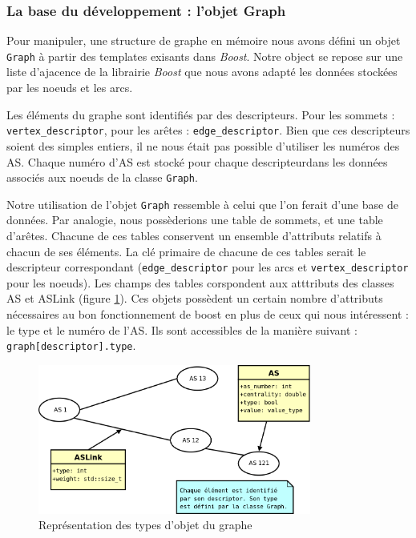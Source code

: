 \subsubsection{La base du développement : l'objet Graph}

Pour manipuler, une structure de graphe en mémoire nous avons défini un objet \verb|Graph| à partir des templates exisants dans \textit{Boost}. Notre object se repose sur une liste d'ajacence de la librairie \textit{Boost} que nous avons adapté les données stockées par les noeuds et les arcs.

Les éléments du graphe sont identifiés par des descripteurs. Pour les sommets : \verb|vertex_descriptor|, pour les arêtes : \verb|edge_descriptor|. Bien que ces descripteurs soient des simples entiers, il ne nous était pas possible d'utiliser les numéros des AS. Chaque numéro d'AS est stocké pour chaque descripteurdans les données associés aux noeuds de la classe \verb|Graph|. %

Notre utilisation de l'objet \verb|Graph| ressemble à celui que l'on ferait d'une base de données. Par analogie, nous possèderions une table de sommets, et une table d'arêtes. Chacune de ces tables conservent un ensemble d'attributs relatifs à chacun de ses éléments. La clé primaire de chacune de ces tables serait le descripteur correspondant (\verb|edge_descriptor| pour les arcs et \verb|vertex_descriptor| pour les noeuds). Les champs des tables corspondent aux atttributs des classes AS et ASLink (figure \ref{bdd}).
Ces objets possèdent un certain nombre d'attributs nécessaires au bon fonctionnement de boost en plus de ceux qui nous intéressent : le type et le numéro de l'AS. Ils sont accessibles de la manière suivant : \verb|graph[descriptor].type|.


\begin{figure}[H]
\begin{center}
        \includegraphics[width=0.8\textwidth]{./schema/bdd.png}
\caption{Représentation des types d'objet du graphe}
\label{bdd}
\end{center}
\end{figure}

